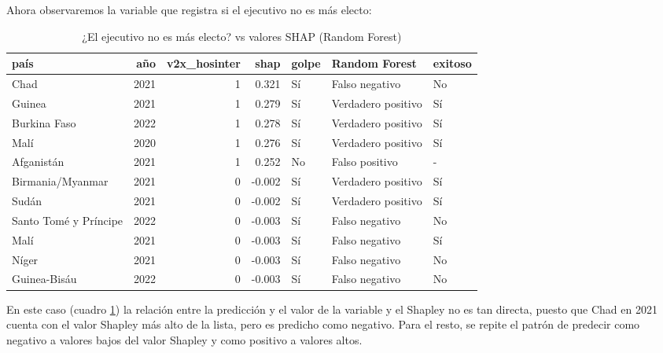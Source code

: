 \documentclass{article}
\begin{document}
Ahora observaremos la variable que registra si el ejecutivo no es más electo:

\begin{table}[H]
 \centering
 \begin{tabular}{lrrrlll}
  \toprule
  país & año & v2x\_hosinter & shap & golpe & Random Forest & exitoso \\
  \midrule
  Chad & 2021 & 1 & 0.321 & Sí & Falso negativo & No \\
  Guinea & 2021 & 1 & 0.279 & Sí & Verdadero positivo & Sí \\
  Burkina Faso & 2022 & 1 & 0.278 & Sí & Verdadero positivo & Sí \\
  Malí & 2020 & 1 & 0.276 & Sí & Verdadero positivo & Sí \\
  Afganistán & 2021 & 1 & 0.252 & No & Falso positivo & - \\
  Birmania/Myanmar & 2021 & 0 & -0.002 & Sí & Verdadero positivo & Sí \\
  Sudán & 2021 & 0 & -0.002 & Sí & Verdadero positivo & Sí \\
  Santo Tomé y Príncipe & 2022 & 0 & -0.003 & Sí & Falso negativo & No \\
  Malí & 2021 & 0 & -0.003 & Sí & Falso negativo & Sí \\
  Níger & 2021 & 0 & -0.003 & Sí & Falso negativo & No \\
  Guinea-Bisáu & 2022 & 0 & -0.003 & Sí & Falso negativo & No \\
  \bottomrule
  \end{tabular}
\caption{¿El ejecutivo no es más electo? vs valores SHAP (Random Forest) \label{tab:shap_rf_hosinter}}
\end{table}

En este caso (cuadro \ref{tab:shap_rf_hosinter}) la relación entre la predicción y el valor de la 
variable y el Shapley no es tan directa, puesto que Chad en 2021 cuenta con el valor Shapley más 
alto de la lista, pero es predicho como negativo. Para el resto, se repite el patrón de predecir 
como negativo a valores bajos del valor Shapley y como positivo a valores altos.
\end{document}
